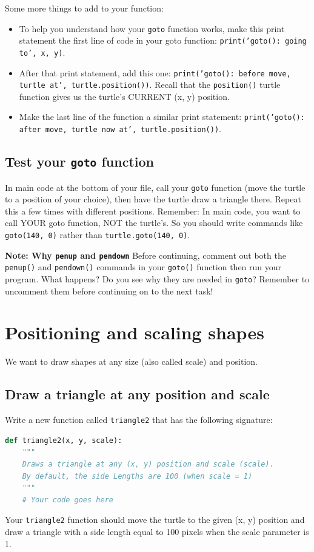 \documentclass[12pt]{article}
\begin{document}
Some more things to add to your function:
\begin{itemize}
\item To help you understand how your \texttt{goto} function works, make this print statement the first line of code in your goto function: \texttt{print('goto(): going to', x, y)}.
\item After that print statement, add this one: \texttt{print('goto(): before move, turtle at', turtle.position())}. Recall that the \texttt{position()} turtle function gives us the turtle's CURRENT (x, y) position.
\item Make the last line of the function a similar print statement: \texttt{print('goto(): after move, turtle now at', turtle.position())}.
\end{itemize}

\subsection{Test your \texttt{goto} function}
In main code at the bottom of your file, call your \texttt{goto} function (move the turtle to a position of your choice), then have the turtle draw a triangle there. Repeat this a few times with different positions.
Remember: In main code, you want to call YOUR goto function, NOT the turtle's. So you should write commands like \texttt{goto(140, 0)} rather than \texttt{turtle.goto(140, 0)}.

\textbf{Note: Why \texttt{penup} and \texttt{pendown}}
Before continuing, comment out both the \texttt{penup()} and \texttt{pendown()} commands in your \texttt{goto()} function then run your program. What happens? Do you see why they are needed in \texttt{goto}?
Remember to uncomment them before continuing on to the next task!

\section{Positioning and scaling shapes}
We want to draw shapes at any size (also called scale) and position.
\subsection{Draw a triangle at any position and scale}
Write a new function called \texttt{triangle2} that has the following signature:

\begin{lstlisting}[language=Python]
def triangle2(x, y, scale):
    """
    Draws a triangle at any (x, y) position and scale (scale).
    By default, the side Lengths are 100 (when scale = 1)
    """
    # Your code goes here
\end{lstlisting}
Your \texttt{triangle2} function should move the turtle to the given (x, y) position and draw a triangle with a side length equal to 100 pixels when the scale parameter is 1.
\end{document}
